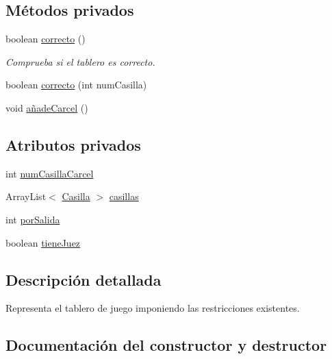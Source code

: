 \subsection*{Métodos privados}
\begin{DoxyCompactItemize}
\item 
boolean \hyperlink{classcivitas_1_1Tablero_a894ba149d31edaec5b8e1917931b831c}{correcto} ()
\begin{DoxyCompactList}\small\item\em Comprueba si el tablero es correcto. \end{DoxyCompactList}\item 
boolean \hyperlink{classcivitas_1_1Tablero_abe88bfd23851da8b2fb4fac8c21214b7}{correcto} (int num\+Casilla)
\item 
void \hyperlink{classcivitas_1_1Tablero_a569f2c5e62ff14c894253af2cb359b62}{añade\+Carcel} ()
\end{DoxyCompactItemize}
\subsection*{Atributos privados}
\begin{DoxyCompactItemize}
\item 
int \hyperlink{classcivitas_1_1Tablero_ae9a072a205d5134cfb298661fc7a9ef5}{num\+Casilla\+Carcel}
\item 
Array\+List$<$ \hyperlink{classcivitas_1_1Casilla}{Casilla} $>$ \hyperlink{classcivitas_1_1Tablero_a0eaa56ffea83ac62b4004782b3fdaa2f}{casillas}
\item 
int \hyperlink{classcivitas_1_1Tablero_a797f295af2f15be3c67aeecad07c985b}{por\+Salida}
\item 
boolean \hyperlink{classcivitas_1_1Tablero_aa9ac9b3f6d7c278a02dd45bcbf8795ab}{tiene\+Juez}
\end{DoxyCompactItemize}


\subsection{Descripción detallada}
Representa el tablero de juego imponiendo las restricciones existentes. 

\subsection{Documentación del constructor y destructor}
\mbox{\label{classcivitas_1_1Tablero_af249aaa71ddb9e7565ffc2852a26303d}} 
